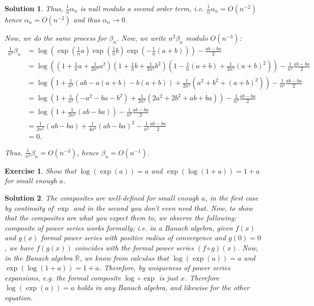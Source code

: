 \documentclass{article}
\newtheorem{ex}{Exercise}
\theoremstyle{nonumberplain}
\newtheorem{sol}{Solution}
\newcommand{\R}{\mathbb{R}}
\begin{document}
\begin{sol}
Thus, $\frac1n \alpha_n$ is null modulo a second order term, i.e. $\frac1n \alpha_n = O(n^{-2})$ hence $\alpha_n = O(n^{-2})$ and thus $\alpha_n \to 0$.

\medskip

Now, we do the same process for $\beta_n$. Now, we write $n^2 \beta_n$ modulo $O(n^{-3})$:
\begin{equation}
\begin{aligned}
\frac1{n^2} \beta_n &= \log\left( \exp(\frac1n a) \exp(\frac1n b) \exp(-\frac1n(a+b)) \right) - \frac{ab-ba}2\\
&= \log\left( {\scriptstyle (1+\frac1n a + \frac1{2 n^2} a^2) (1+\frac1n b + \frac1{2 n^2} b^2) (1-\frac1n (a+b) + \frac1{2 n^2} (a+b)^2)} \right) - \frac1{n^2}\frac{ab-ba}2\\
&= \log\left( 1 + \frac1{n^2} (ab - a(a+b) - b(a+b)) + \frac1{2n^2}(a^2 + b^2 + (a+b)^2) \right) - \frac1{n^2}\frac{ab-ba}2\\
&= \log\left( 1 + \frac1{n^2} (- a^2 - ba - b^2) + \frac1{2n^2}(2 a^2 + 2 b^2 + ab + ba) \right) - \frac1{n^2}\frac{ab-ba}2\\
&= \log\left( 1 + \frac1{2n^2} (ab - ba) \right) - \frac1{n^2}\frac{ab-ba}2\\
&= \frac1{2n^2} (ab-ba) + \frac1{4n^4}(ab-ba)^2 - \frac1{n^2}\frac{ab-ba}2\\
&= 0.
\end{aligned}
\end{equation}

Thus, $\frac1{n^2} \beta_n = O(n^{-3})$, hence $\beta_n = O(n^{-1})$.
\end{sol}

\begin{ex}
Show that $\log(\exp(a)) = a$ and $\exp(\log(1+a)) = 1+a$ for small enough $a$.
\end{ex}

\begin{sol}
The composites are well-defined for small enough $a$, in the first case by continuity of $\exp$ and in the second you don't even need that. Now, to show that the composites are what you expect them to, we observe the following: composite of power series works formally; i.e. in a Banach algebra, given $f(x)$ and $g(x)$ formal power series with positive radius of convergence and $g(0) = 0$, we have $f(g(x))$ coincides with the formal power series $(f \circ g)(x)$. Now, in the Banach algebra $\R$, we know from calculus that $\log(\exp(a)) = a$ and $\exp(\log(1+a)) = 1+a$. Therefore, by uniqueness of power series expansions, e.g. the formal composite $\log \circ \exp$ is just $x$. Therefore $\log(\exp(a)) = a$ holds in any Banach algebra, and likewise for the other equation.
\end{sol}
\end{document}
